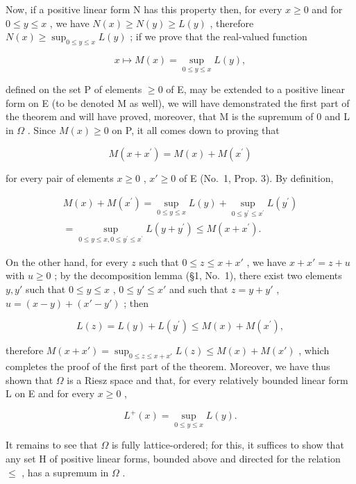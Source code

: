 Now, if a positive linear form N has this property then, for every \(x \geqslant 0\) and for \(0 \leqslant y \leqslant x\) , we have \(N(x) \geqslant N(y) \geqslant L(y)\) , therefore \(N(x) \geqslant \sup_{0 \leqslant y \leqslant x} L(y)\) ; if we prove that the real-valued function

\[
x \mapsto M (x) = \sup _ {0 \leqslant y \leqslant x} L (y),
\]

defined on the set P of elements \(\geqslant0\) of E, may be extended to a positive linear form on E (to be denoted M as well), we will have demonstrated the first part of the theorem and will have proved, moreover, that M is the supremum of 0 and L in \(\Omega\) . Since \(M(x)\geqslant0\) on P, it all comes down to proving that

\[
M (x + x ^ {\prime}) = M (x) + M (x ^ {\prime})
\]

for every pair of elements \(x \geqslant 0\) , \(x' \geqslant 0\) of E (No.~1, Prop. 3). By definition,

\[
\begin{array}{c} M (x) + M (x ^ {\prime}) = \sup _ {0 \leqslant y \leqslant x} L (y) + \sup _ {0 \leqslant y ^ {\prime} \leqslant x ^ {\prime}} L (y ^ {\prime}) \\ = \sup _ {0 \leqslant y \leqslant x, 0 \leqslant y ^ {\prime} \leqslant x ^ {\prime}} L (y + y ^ {\prime}) \leqslant M (x + x ^ {\prime}). \end{array}
\]

On the other hand, for every \(z\) such that \(0 \leqslant z \leqslant x + x'\) , we have \(x + x' = z + u\) with \(u \geqslant 0\) ; by the decomposition lemma (§1, No.~1), there exist two elements \(y, y'\) such that \(0 \leqslant y \leqslant x\) , \(0 \leqslant y' \leqslant x'\) and such that \(z = y + y'\) , \(u = (x - y) + (x' - y')\) ; then

\[
L (z) = L (y) + L \left(y ^ {\prime}\right) \leqslant M (x) + M \left(x ^ {\prime}\right),
\]

therefore \(M(x + x') = \sup_{0 \leqslant z \leqslant x + x'} L(z) \leqslant M(x) + M(x')\) , which completes the proof of the first part of the theorem. Moreover, we have thus shown that \(\Omega\) is a Riesz space and that, for every relatively bounded linear form L on E and for every \(x \geqslant 0\) ,

\[
L ^ {+} (x) = \sup _ {0 \leqslant y \leqslant x} L (y).\tag{1}
\]

It remains to see that \(\Omega\) is fully lattice-ordered; for this, it suffices to show that any set H of positive linear forms, bounded above and directed for the relation \(\leqslant\) , has a supremum in \(\Omega\) .

